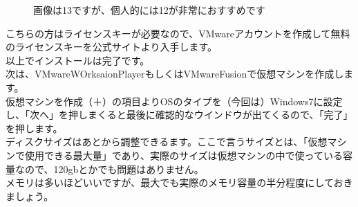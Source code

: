 \documentclass[b5paper,9pt,platex,dvipdfmx]{jsarticle}
\begin{document}
\begin{multicols*}{3}
{\begin{figure}[H]
  \caption{画像は13ですが、個人的には12が非常におすすめです}
\end{figure}
こちらの方はライセンスキーが必要なので、VMwareアカウントを作成して無料のライセンスキーを公式サイトより入手します。\\
以上でインストールは完了です。\\
次は、VMwareWOrksaionPlayerもしくはVMwareFusionで仮想マシンを作成します。\\
仮想マシンを作成（＋）の項目よりOSのタイプを（今回は）Windows7に設定し、「次へ」を押しまくると最後に確認的なウインドウが出てくるので、「完了」を押します。\\
ディスクサイズはあとから調整できるます。ここで言うサイズとは、「仮想マシンで使用できる最大量」であり、実際のサイズは仮想マシンの中で使っている容量なので、120gbとかでも問題はありません。\\
メモリは多いほどいいですが、最大でも実際のメモリ容量の半分程度にしておきましょう。\\
}
\end{multicols*}
\end{document}

